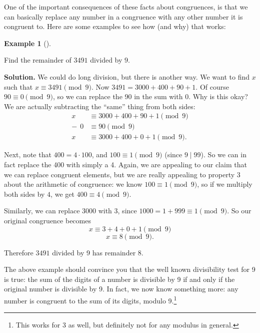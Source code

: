 \documentclass[10pt,]{book}
\theoremstyle{plain}
\theoremstyle{definition}
\newtheorem{example}[theorem]{Example}
\theoremstyle{definition}
\theoremstyle{definition}
\numberwithin{equation}{chapter}
\newcommand{\amp}{ & }
\begin{document}
One of the important consequences of these facts about congruences, is that we can basically replace any number in a congruence with any other number it is congruent to. Here are some examples to see how (and why) that works:
%
\begin{example}[]\label{example-117}

Find the remainder of \(3491\) divided by \(9\).
%
\par\medskip\noindent%
\textbf{Solution.}\quad
We could do long division, but there is another way. We want to find \(x\) such that \(x \equiv 3491 \pmod{9}\). Now \(3491 = 3000 + 400 + 90 + 1\). Of course \(90 \equiv 0 \pmod 9\), so we can replace the 90 in the sum with 0. Why is this okay? We are actually subtracting the ``same'' thing from both sides:
\begin{equation*}
  \begin{aligned}x \amp  \equiv 3000 + 400 + 90 + 1 \pmod 9 \\
  	- ~~ 0 \amp  \equiv 90 \pmod 9 \\
  	x \amp  \equiv 3000 + 400 + 0 + 1\pmod 9.
\end{aligned}
\end{equation*}
%
\par

Next, note that \(400 = 4 \cdot 100\), and \(100 \equiv 1 \pmod 9\) (since \(9 \mid 99\)). So we can in fact replace the 400 with simply a 4. Again, we are appealing to our claim that we can replace congruent elements, but we are really appealing to property 3 about the arithmetic of congruence: we know \(100 \equiv 1 \pmod{9}\), so if we multiply both sides by \(4\), we get \(400 \equiv 4 \pmod 9\).
%
\par

Similarly, we can replace 3000 with 3, since \(1000 = 1 + 999 \equiv 1 \pmod 9\). So our original congruence becomes
\begin{equation*}
  x \equiv 3 + 4 + 0 + 1 \pmod 9
\end{equation*}
%
\begin{equation*}
  x \equiv 8 \pmod 9.
\end{equation*}\par

Therefore \(3491\) divided by 9 has remainder 8.
%
\end{example}
\par

The above example should convince you that the well known divisibility test for 9 is true: the sum of the digits of a number is divisible by 9 if and only if the original number is divisible by 9. In fact, we now know something more: any number is congruent to the sum of its digits, modulo 9.\footnote{This works for 3 as well, but definitely not for any modulus in general.\label{fn-22}}
%
\par
\end{document}
